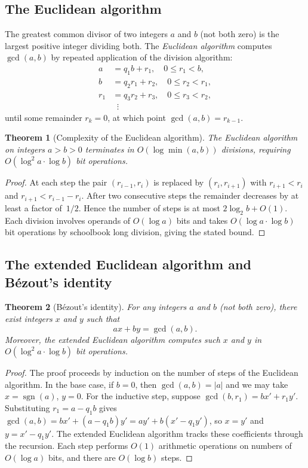 \documentclass[twoside,12pt]{book}
\theoremstyle{plain}
\newtheorem{theorem}{Theorem}[chapter]
\theoremstyle{definition}
\theoremstyle{remark}
\begin{document}
\subsection{The Euclidean algorithm}

The greatest common divisor of two integers $a$ and $b$ (not both zero) is the largest positive integer dividing both. The \emph{Euclidean algorithm} computes $\gcd(a, b)$ by repeated application of the division algorithm:
\begin{align*}
a &= q_1 b + r_1, \quad 0 \leq r_1 < b, \\
b &= q_2 r_1 + r_2, \quad 0 \leq r_2 < r_1, \\
r_1 &= q_3 r_2 + r_3, \quad 0 \leq r_3 < r_2, \\
&\;\;\vdots
\end{align*}
until some remainder $r_k = 0$, at which point $\gcd(a, b) = r_{k-1}$.

\begin{theorem}[Complexity of the Euclidean algorithm]
\label{thm:euclid}
The Euclidean algorithm on integers $a > b > 0$ terminates in $O(\log \min(a, b))$ divisions, requiring $O(\log^2 a \cdot \log b)$ bit operations.
\end{theorem}

\begin{proof}
At each step the pair $(r_{i-1}, r_i)$ is replaced by $(r_i, r_{i+1})$ with $r_{i+1} < r_i$ and $r_{i+1} < r_{i-1} - r_i$. After two consecutive steps the remainder decreases by at least a factor of~$1/2$. Hence the number of steps is at most $2 \log_2 b + O(1)$. Each division involves operands of $O(\log a)$ bits and takes $O(\log a \cdot \log b)$ bit operations by schoolbook long division, giving the stated bound.
\end{proof}

\subsection{The extended Euclidean algorithm and B\'ezout's identity}

\begin{theorem}[B\'ezout's identity]
\label{thm:bezout}
For any integers $a$ and $b$ (not both zero), there exist integers $x$ and $y$ such that
\[
ax + by = \gcd(a, b).
\]
Moreover, the \emph{extended Euclidean algorithm} computes such $x$ and $y$ in $O(\log^2 a \cdot \log b)$ bit operations.
\end{theorem}

\begin{proof}
The proof proceeds by induction on the number of steps of the Euclidean algorithm. In the base case, if $b = 0$, then $\gcd(a, b) = |a|$ and we may take $x = \operatorname{sgn}(a)$, $y = 0$. For the inductive step, suppose $\gcd(b, r_1) = bx' + r_1 y'$. Substituting $r_1 = a - q_1 b$ gives $\gcd(a, b) = bx' + (a - q_1 b)y' = ay' + b(x' - q_1 y')$, so $x = y'$ and $y = x' - q_1 y'$. The extended Euclidean algorithm tracks these coefficients through the recursion. Each step performs $O(1)$ arithmetic operations on numbers of $O(\log a)$ bits, and there are $O(\log b)$ steps.
\end{proof}
\end{document}
